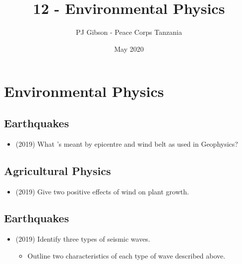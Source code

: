 \documentclass{article}
\title{12 - Environmental Physics}
\author{PJ Gibson - Peace Corps Tanzania}
\date{May 2020}
\begin{document}
\maketitle


\section{Environmental Physics}

\subsection{Earthquakes}
\begin{itemize}
\item (2019)  What 's meant by epicentre and wind belt as used in Geophysics? 
\end{itemize}

\subsection{Agricultural Physics}
\begin{itemize}
\item (2019)  Give two positive effects of wind on plant growth.
\end{itemize}

\subsection{Earthquakes}
\begin{itemize}
\item (2019)  Identify three types of seismic waves.
 \begin{itemize}
\item Outline two characteristics of each type of wave described above.
\end{itemize}
\end{itemize}
\end{document}
